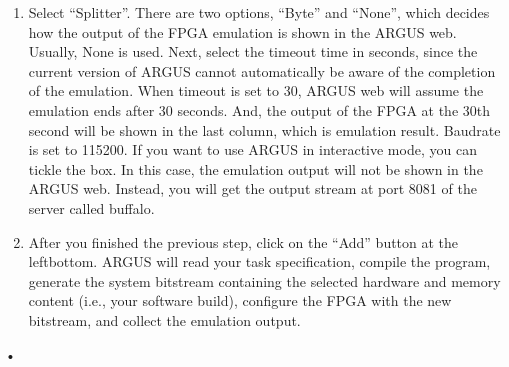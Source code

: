 \documentclass[a4paper,10pt]{article}
\begin{document}
\begin{enumerate}
\begin{verbatim}
[
	{
		"imem": "simple_imem_ctrl",
		"dmem": "simple_dmem_ctrl",
		"name": "simple_leon2",
		"target": "sparcv7w_pg",
		"options": {
			"NODE_NUM": "0"
		},
		"app": "adpcm1"
	}
]
\end{verbatim}•
\item Select ``Splitter''. There are two options, ``Byte'' and ``None'', which decides how the output of the FPGA emulation is shown in the ARGUS web. Usually, None is used. Next, select the timeout time in seconds, since the current version of ARGUS cannot automatically be aware of the completion of the emulation. When timeout is set to 30, ARGUS web will assume the emulation ends after 30 seconds. And, the output of the FPGA at the 30th second will be shown in the last column, which is emulation result. Baudrate is set to 115200. If you want to use ARGUS in interactive mode, you can tickle the box. In this case, the emulation output will not be shown in the ARGUS web. Instead, you will get the output stream at port 8081 of the server called buffalo. 
\item After you finished the previous step, click on the ``Add'' button at the leftbottom. ARGUS will read your task specification, compile the program, generate the system bitstream containing the selected hardware and memory content (i.e., your software build), configure the FPGA with the new bitstream, and collect the emulation output. 
\end{enumerate}•

\newpage
\end{document}
